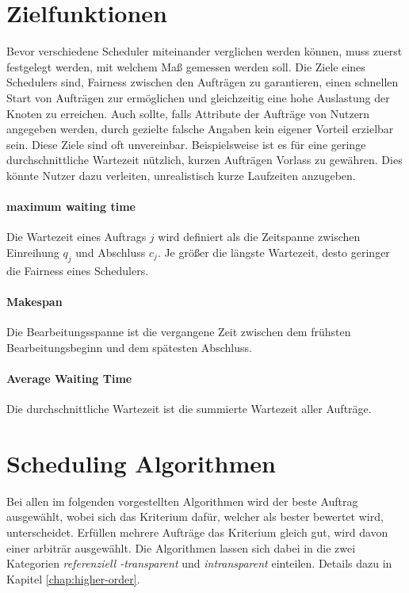 \section{Zielfunktionen}
\label{2-zielfunktionen}
Bevor verschiedene Scheduler miteinander verglichen werden können, muss zuerst festgelegt werden, mit welchem Maß gemessen werden soll. Die Ziele eines Schedulers sind, Fairness zwischen den Aufträgen zu garantieren, einen schnellen Start von Aufträgen zur ermöglichen und gleichzeitig eine hohe Auslastung der Knoten zu erreichen. Auch sollte, falls Attribute der Aufträge von Nutzern angegeben werden, durch gezielte falsche Angaben kein eigener Vorteil erzielbar sein. Diese Ziele sind oft unvereinbar. Beispielsweise ist es für eine geringe durchschnittliche Wartezeit nützlich, kurzen Aufträgen Vorlass zu gewähren. Dies könnte Nutzer dazu verleiten, unrealistisch kurze Laufzeiten anzugeben.

\paragraph{maximum waiting time}
Die Wartezeit eines Auftrags $j$ wird definiert als die Zeitspanne zwischen Einreihung $q_j$ und Abschluss $c_j$. Je größer die längste Wartezeit, desto geringer die Fairness eines Schedulers.

\paragraph{Makespan}
Die Bearbeitungsspanne ist die vergangene Zeit zwischen dem frühsten Bearbeitungsbeginn und dem spätesten Abschluss.

\paragraph{Average Waiting Time}
Die durchschnittliche Wartezeit ist die summierte Wartezeit aller Aufträge.

\section{Scheduling Algorithmen}
\label{2-schedulers}
Bei allen im folgenden vorgestellten Algorithmen wird der beste Auftrag ausgewählt, wobei sich das Kriterium dafür, welcher als bester bewertet wird, unterscheidet. Erfüllen mehrere Aufträge das Kriterium gleich gut, wird davon einer arbiträr ausgewählt. Die Algorithmen lassen sich dabei in die zwei Kategorien \emph{referenziell -transparent} und \emph{intransparent} einteilen. Details dazu in Kapitel \ref{chap:higher-order}.

